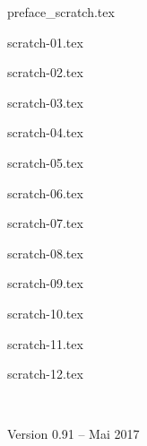 \documentclass[12pt]{report}
\begin{document}
\renewcommand{\contentsname}{Sommaire}

{preface_scratch.tex}

\debutchapitres


{scratch-01.tex}

{scratch-02.tex}

{scratch-03.tex}

{scratch-04.tex}

{scratch-05.tex}

{scratch-06.tex}


{scratch-07.tex}

{scratch-08.tex}

{scratch-09.tex}

{scratch-10.tex}

{scratch-11.tex}

{scratch-12.tex}


\newpage
\ 
\vfill



\vspace*{5cm}

\centerline{Version 0.91 -- Mai 2017}

\vspace*{1cm}
\end{document}
